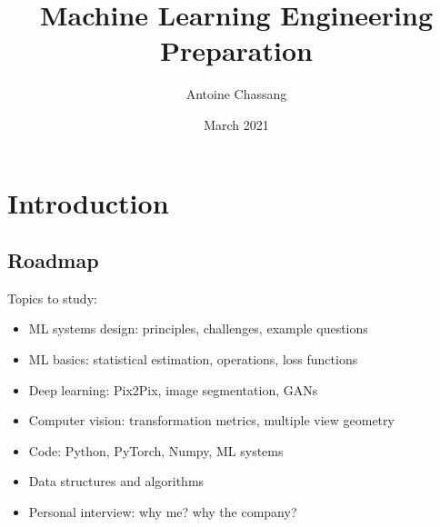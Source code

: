 \documentclass{report}
\title{Machine Learning Engineering Preparation}
\author{Antoine Chassang}
\date{March 2021}
\begin{document}
\maketitle
\tableofcontents
\chapter{Introduction}
    \section{Roadmap}
    Topics to study:
    \begin{itemize}
        \item ML systems design: principles, challenges, example questions
        \item ML basics: statistical estimation, operations, loss functions
        \item Deep learning: Pix2Pix, image segmentation, GANs
        \item Computer vision: transformation metrics, multiple view geometry
        \item Code: Python, PyTorch, Numpy, ML systems
        \item Data structures and algorithms
        \item Personal interview: why me? why the company?
    \end{itemize}















\end{document}
